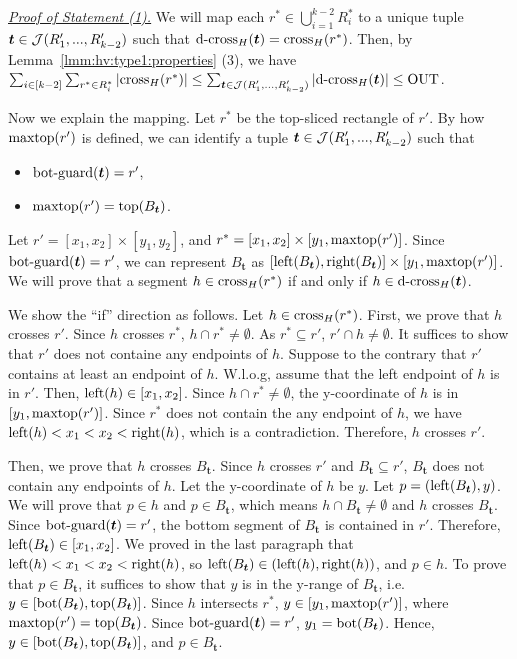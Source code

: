 \noindent \underline{\em Proof of Statement (1).}
We will map each $r^*\in \bigcup_{i = 1}^{k-2} R_i^*$ to a unique tuple $\textrm{\boldmath${t}$}\in \mathcal{J}(R_1',...,R_{k-2}')$ such that $\mathrm{d\text{-}cross}_H(\textrm{\boldmath${t}$}) = \mathrm{cross}_H(r^*)$. Then, by Lemma~\ref{lmm:hv:type1:properties} (3), we have $\sum_{i\in[k-2]}\sum_{r^*\in R_i^*} |\mathrm{cross}_H(r^*)| \leq \sum_{\textrm{\boldmath${t}$}\in \mathcal{J}(R_1',...,R_{k-2}')}|\mathrm{d\text{-}cross}_H(\textrm{\boldmath${t}$})|\leq \mathrm{OUT}$.

\vgap 

Now we explain the mapping. Let $r^*$ be the top-sliced rectangle of $r'$. By how $\mathrm{maxtop}(r')$ is defined, we can identify a tuple $\textrm{\boldmath${t}$}\in \mathcal{J}(R_1',...,R_{k-2}')$ such that 
\begin{itemize}
    \item $\mathrm{bot\text{-}guard}(\textrm{\boldmath${t}$}) = r'$,
    \item $\mathrm{maxtop}(r') = \mathrm{top}(B_{\textrm{\boldmath${t}$}})$.
\end{itemize}
Let $r' = [x_1,x_2]\times [y_1,y_2]$, and $r^* = [x_1,x_2]\times [y_1,\mathrm{maxtop}(r')]$. Since $\mathrm{bot\text{-}guard}(\textrm{\boldmath${t}$}) = r'$, we can represent $B_{\bm{t}}$ as $[\mathrm{left}(B_{\textrm{\boldmath${t}$}}), \mathrm{right}(B_{\textrm{\boldmath${t}$}})]\times [y_1, \mathrm{maxtop}(r')]$.
We will prove that a segment $h\in \mathrm{cross}_H(r^*)$ if and only if $h\in \mathrm{d\text{-}cross}_H(\textrm{\boldmath${t}$})$. 

\vgap 

We show the ``if'' direction as follows. Let $h\in \mathrm{cross}_H(r^*)$. First, we prove that $h$ crosses $r'$. Since $h$ crosses $r^*$, $h \cap r^* \neq \emptyset$. As $r^* \subseteq r'$, $r'\cap h \neq \emptyset$. It suffices to show that $r'$ does not containe any endpoints of $h$.
Suppose to the contrary that $r'$ contains at least an endpoint of $h$. W.l.o.g, assume that the left endpoint of $h$ is in $r'$.
Then, $\mathrm{left}(h)\in[x_1,x_2]$. Since $h\cap r^*\neq \emptyset$, the y-coordinate of $h$ is in $[y_1,\mathrm{maxtop}(r')]$. Since $r^*$ does not contain the any endpoint of $h$, we have $\mathrm{left}(h)<x_1<x_2<\mathrm{right}(h)$, 
which is a contradiction. Therefore, $h$ crosses $r'$.  

\vgap 

Then, we prove that $h$ crosses $B_{\bm{t}}$. Since $h$ crosses $r'$ and $B_{\bm{t}}\subseteq r'$, $B_{\bm{t}}$ does not contain any endpoints of $h$. Let the y-coordinate of $h$ be $y$. Let $p = (\mathrm{left}(B_{\textrm{\boldmath${t}$}}), y)$. We will prove that $p \in h$ and $p \in B_{\bm{t}}$, which means $h\cap B_{\bm{t}} \neq \emptyset$ and $h$ crosses $B_{\bm{t}}$. Since $\mathrm{bot\text{-}guard}(\textrm{\boldmath${t}$}) = r'$, the bottom segment of $B_{\bm{t}}$ is contained in $r'$. Therefore,  
$\mathrm{left}(B_{\textrm{\boldmath${t}$}})\in [x_1,x_2]$. We proved in the last paragraph that $\mathrm{left}(h)<x_1<x_2<\mathrm{right}(h)$, so  $\mathrm{left}(B_{\textrm{\boldmath${t}$}}) \in (\mathrm{left}(h),\mathrm{right}(h))$, and $p\in h$. To prove that $p\in B_{\bm{t}}$, it suffices to show that $y$ is in the y-range of $B_{\bm{t}}$, i.e. $y \in [\mathrm{bot}(B_{\textrm{\boldmath${t}$}}), \mathrm{top}(B_{\textrm{\boldmath${t}$}})]$.
 Since $h$ intersects $r^*$, $y \in [y_1 , \mathrm{maxtop}(r')]$, where $\mathrm{maxtop}(r') = \mathrm{top}(B_{\textrm{\boldmath${t}$}})$. Since $\mathrm{bot\text{-}guard}(\textrm{\boldmath${t}$}) = r'$, $y_1 = \mathrm{bot}(B_{\textrm{\boldmath${t}$}})$. Hence, $y\in [\mathrm{bot}(B_{\textrm{\boldmath${t}$}}), \mathrm{top}(B_{\textrm{\boldmath${t}$}})]$, and $p\in B_{\bm{t}}$.  

